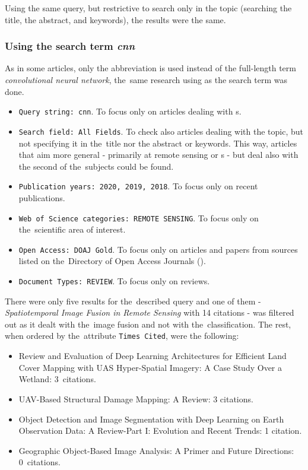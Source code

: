 Using the same query, but restrictive to search only in the topic (searching the title, the abstract, and keywords), the results were the same.

\subsubsection{Using the search term \textit{cnn}}
\label{wos-reviews-cnn}

As in some articles, only the abbreviation \textit{} is used instead of the full-length term \textit{convolutional neural network}, the~same research using \textit{} as the search term was done.

\begin{itemize}
	\item \verb|Query string: cnn|. To focus only on articles dealing with s.
	\item \verb|Search field: All Fields|. To check also articles dealing with the topic, but not specifying it in the~title nor the abstract or keywords. This way, articles that aim more general - primarily at remote sensing or s - but deal also with the second of the~subjects could be found.
	\item \verb|Publication years: 2020, 2019, 2018|. To focus only on recent publications.
	\item \verb|Web of Science categories: REMOTE SENSING|. To focus only on the~scien\-ti\-fic area of interest.
	\item \verb|Open Access: DOAJ Gold|. To focus only on articles and papers from sources listed on the~Di\-rectory of Open Access Journals ().
	\item \verb|Document Types: REVIEW|. To focus only on reviews.
\end{itemize}

\noindent There were only five results for the~described query and one of them - \textit{Spatiotemporal Image Fusion in Remote Sensing} \cite{review-st-fusion} with 14 citations - was filtered out as it dealt with the~image fusion and not with the~classification. The rest, when ordered by the~attribute \verb|Times Cited|, were the following:

\begin{itemize}
	\item Review and Evaluation of Deep Learning Architectures for Efficient Land Cover Mapping with UAS Hyper-Spatial Imagery: A Case Study Over a Wetland: 3~citations. \cite{review-dl-wetlands}
	\item UAV-Based Structural Damage Mapping: A Review: 3 citations. \cite{uav-building-damages}
	\item Object Detection and Image Segmentation with Deep Learning on Earth Observation Data: A Review-Part I: Evolution and Recent Trends: 1 citation. \cite{review-dl-eo}
	\item Geographic Object-Based Image Analysis: A Primer and Future Directions: 0~citations. \cite{geobia}
\end{itemize}

